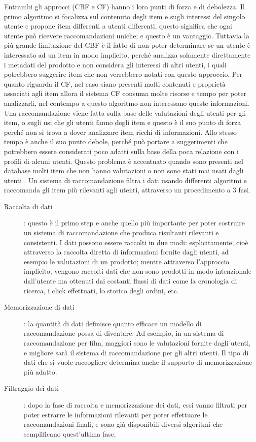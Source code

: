 Entrambi gli approcci (CBF e CF) hanno i loro punti di forza e di debolezza. Il primo algoritmo si focalizza sul contenuto degli item e
sugli interessi del singolo utente e propone item differenti a utenti differenti, questo significa che ogni utente può ricevere 
raccomandazioni uniche; e questo è un vantaggio. 
Tuttavia la più grande limitazione del CBF è il fatto di non poter determinare se un utente è interessato ad un item in modo implicito,
perché analizza solamente direttamente i metadati del prodotto e non considera gli interessi di altri utenti, i quali potrebbero 
suggerire item che non verrebbero notati con questo approccio.
Per quanto riguarda il CF, nel caso siano presenti molti contenuti e proprietà associati agli item allora il sistema CF consuma molte 
risorse e tempo per poter analizzarli, nel contempo a questo algoritmo non interessano queste informazioni. Una raccomandazione 
viene fatta sulla base delle valutazioni degli utenti per gli item, o sugli usi che gli utenti fanno degli item e questo è il suo punto 
di forza perché non si trova a dover analizzare item ricchi di informazioni. Allo stesso tempo è anche il suo punto debole, perché può
portare a suggerimenti che potrebbero essere considerati poco adatti sulla base della poca relazione con i profili di alcuni utenti. 
Questo problema è accentuato quando sono presenti nel database molti item che non hanno valutazioni o non sono stati mai usati dagli 
utenti \cite{model-based-approach-for-collaborative-filtering}.
\vspace{0.5cm}
\hfill\break
Un sistema di raccomandazione filtra i dati usando differenti algoritmi e raccomanda gli item più rilevanti agli utenti, attraverso 
un procedimento a 3 fasi.
\begin{description}
    \item[Raccolta di dati]: questo è il primo step e anche quello più importante per poter costruire un sistema di 
    raccomandazione che produca risultanti rilevanti e consistenti. I dati possono essere raccolti in due modi: esplicitamente, 
    cioè attraverso la raccolta diretta di informazioni fornite dagli utenti, ad esempio le valutazioni di un prodotto; mentre 
    attraverso l'approccio implicito, vengono raccolti dati che non sono prodotti in modo intenzionale dall'utente ma ottenuti 
    dai costanti flussi di dati come la cronologia di ricerca, i click effettuati, lo storico degli ordini, etc.
    \item[Memorizzazione di dati]: la quantità di dati definisce quanto efficace un modello di raccomandazione possa di 
    diventare. Ad esempio, in un sistema di raccomandazione per film, maggiori sono le valutazioni fornite dagli utenti, e 
    migliore sarà il sistema di raccomandazione per gli altri utenti. Il tipo di dati che si vuole raccogliere determina
    anche il supporto di memorizzazione più adatto.   
    \item[Filtraggio dei dati]: dopo la fase di raccolta e memorizzazione dei dati, essi vanno filtrati per poter estrarre 
    le informazioni rilevanti per poter effettuare le raccomandazioni finali, e sono già disponibili diversi algoritmi che 
    semplificano quest'ultima fase. 
\end{description}
